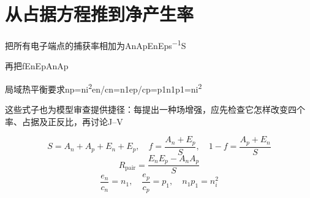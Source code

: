 \section{{\cjkfont 从占据方程推到净产生率}\allowbreak{}}\label{sec:14}
{\cjkfont 把所有电子端点的捕获率相加为}\allowbreak{}An\allowbreak{}Ap\allowbreak{}En\allowbreak{}Ep\allowbreak{}s\textsuperscript{−1}\allowbreak{}S\allowbreak{}
\par
{\cjkfont 再把}\allowbreak{}f\allowbreak{}EnEp\allowbreak{}AnAp\allowbreak{}
\par
{\cjkfont 局域热平衡要求}\allowbreak{}np=\allowbreak{}ni\textsuperscript{2}\allowbreak{}en/cn=\allowbreak{}n1\allowbreak{}ep/cp=\allowbreak{}p1\allowbreak{}n1p1=\allowbreak{}ni\textsuperscript{2}\allowbreak{}
\par
{\cjkfont 这些式子也为模型审查提供捷径：每提出一种场增强，应先检查它怎样改变四个率、占据及正反比，再讨论}\allowbreak{}J–V\allowbreak{}
\par
\begin{equation}
S=A_n+A_p+E_n+E_p,\quad f=\frac{A_n+E_p}{S},\quad 1-f=\frac{A_p+E_n}{S}
\label{eq:11}\end{equation}
\begin{equation}
R_{\mathrm{pair}}=\frac{E_nE_p-A_nA_p}{S}
\label{eq:12}\end{equation}
\begin{equation}
\frac{e_n}{c_n}=n_1,\quad\frac{e_p}{c_p}=p_1,\quad n_1p_1=n_i^2
\label{eq:13}\end{equation}

